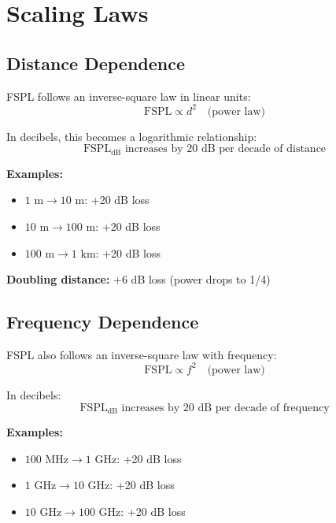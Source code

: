 \section{Scaling Laws}
\label{sec:scaling-laws}

\subsection{Distance Dependence}

FSPL follows an inverse-square law in linear units:
\begin{equation}
\text{FSPL} \propto d^2 \quad \text{(power law)}
\end{equation}

In decibels, this becomes a logarithmic relationship:
\begin{equation}
\text{FSPL}_{\text{dB}} \text{ increases by 20 dB per decade of distance}
\end{equation}

\textbf{Examples:}
\begin{itemize}
\item $1 \text{ m} \rightarrow 10 \text{ m}$: +20 dB loss
\item $10 \text{ m} \rightarrow 100 \text{ m}$: +20 dB loss
\item $100 \text{ m} \rightarrow 1 \text{ km}$: +20 dB loss
\end{itemize}

\textbf{Doubling distance:} +6 dB loss (power drops to 1/4)

\subsection{Frequency Dependence}

FSPL also follows an inverse-square law with frequency:
\begin{equation}
\text{FSPL} \propto f^2 \quad \text{(power law)}
\end{equation}

In decibels:
\begin{equation}
\text{FSPL}_{\text{dB}} \text{ increases by 20 dB per decade of frequency}
\end{equation}

\textbf{Examples:}
\begin{itemize}
\item $100 \text{ MHz} \rightarrow 1 \text{ GHz}$: +20 dB loss
\item $1 \text{ GHz} \rightarrow 10 \text{ GHz}$: +20 dB loss
\item $10 \text{ GHz} \rightarrow 100 \text{ GHz}$: +20 dB loss
\end{itemize}

